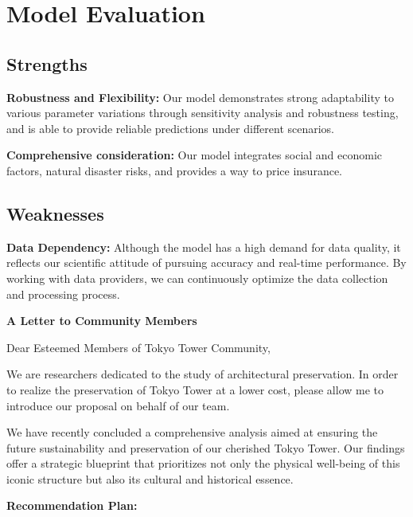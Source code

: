 \documentclass{mcmthesis}
\begin{document}
\section{Model Evaluation}

\subsection{Strengths}

{\bf Robustness and Flexibility:} Our model demonstrates strong adaptability to various parameter
variations through sensitivity analysis and robustness testing, and is able to provide
reliable predictions under different scenarios.

{\bf Comprehensive consideration:} Our model integrates social and economic factors, natural
disaster risks, and provides a way to price insurance.

\subsection{Weaknesses}

{\bf Data Dependency:} Although the model has a high demand for data quality, it reflects our
scientific attitude of pursuing accuracy and real-time performance. By working with data providers,
we can continuously optimize the data collection and processing process.

\printbibliography

\newpage

\begin{center}
{\Large \textbf{A Letter to Community Members}}   
\end{center}

\vspace{0.5cm}

\noindent Dear Esteemed Members of Tokyo Tower Community,

We are researchers dedicated to the study of architectural preservation. In order to realize the preservation of Tokyo Tower at a lower cost, please allow me to introduce our proposal on behalf of our team.

We have recently concluded a comprehensive analysis aimed at ensuring the future sustainability and preservation of our cherished Tokyo Tower. Our findings offer a strategic blueprint that prioritizes not only the physical well-being of this iconic structure but also its cultural and historical essence.


\textbf{Recommendation Plan:}
\end{document}
